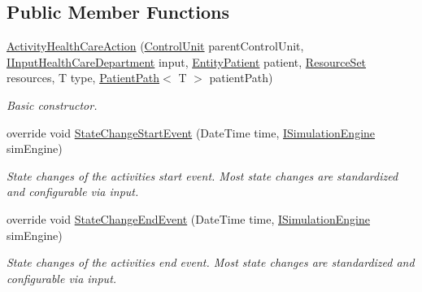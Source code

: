 \subsection*{Public Member Functions}
\begin{DoxyCompactItemize}
\item 
\hyperlink{class_general_health_care_elements_1_1_activities_1_1_activity_health_care_action_aa193e4c335c3cd1771014c5a264b66e0}{Activity\+Health\+Care\+Action} (\hyperlink{class_simulation_core_1_1_h_c_c_m_elements_1_1_control_unit}{Control\+Unit} parent\+Control\+Unit, \hyperlink{interface_general_health_care_elements_1_1_input_1_1_i_input_health_care_department}{I\+Input\+Health\+Care\+Department} input, \hyperlink{class_general_health_care_elements_1_1_entities_1_1_entity_patient}{Entity\+Patient} patient, \hyperlink{class_general_health_care_elements_1_1_resource_handling_1_1_resource_set}{Resource\+Set} resources, T type, \hyperlink{class_general_health_care_elements_1_1_general_classes_1_1_action_types_and_paths_1_1_patient_path}{Patient\+Path}$<$ T $>$ patient\+Path)
\begin{DoxyCompactList}\small\item\em Basic constructor. \end{DoxyCompactList}\item 
override void \hyperlink{class_general_health_care_elements_1_1_activities_1_1_activity_health_care_action_a62d1bf6eef19e4e6be9d5df8d6fee78d}{State\+Change\+Start\+Event} (Date\+Time time, \hyperlink{interface_simulation_core_1_1_simulation_classes_1_1_i_simulation_engine}{I\+Simulation\+Engine} sim\+Engine)
\begin{DoxyCompactList}\small\item\em State changes of the activities start event. Most state changes are standardized and configurable via input. \end{DoxyCompactList}\item 
override void \hyperlink{class_general_health_care_elements_1_1_activities_1_1_activity_health_care_action_a446e514bd7cba08e23a953c081c1444c}{State\+Change\+End\+Event} (Date\+Time time, \hyperlink{interface_simulation_core_1_1_simulation_classes_1_1_i_simulation_engine}{I\+Simulation\+Engine} sim\+Engine)
\begin{DoxyCompactList}\small\item\em State changes of the activities end event. Most state changes are standardized and configurable via input. \end{DoxyCompactList}\item 

\end{DoxyCompactItemize}
